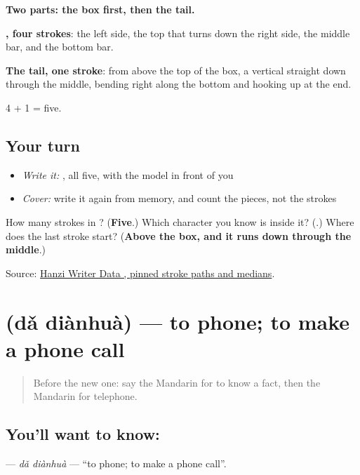 \begin{quote}
\end{quote}

\textbf{Two parts: the box first, then the tail.}

\textbf{, four strokes}: the left side, the top that turns down the right side, the middle bar, and the bottom bar.

\textbf{The tail, one stroke}: from above the top of the box, a vertical straight down through the middle, bending right along the bottom and hooking up at the end.

4 + 1 = five.

\subsection*{Your turn}
\begin{itemize}
\raggedright
  \item \emph{Write it:} , all five, with the model in front of you
  \item \emph{Cover:} write it again from memory, and count the pieces, not the strokes
\end{itemize}

\begin{tcolorbox}[breakable,colback=teal!4,colframe=teal!35!black,title={Before you move on}]
How many strokes in ? (\textbf{Five}.) Which character you know is inside it? (\textbf{}.) Where does the last stroke start? (\textbf{Above the box, and it runs down through the middle}.)

Source: \href{https://raw.githubusercontent.com/chanind/hanzi-writer-data/68d10a4b21150cae5e1ebbd223eed289cf32d90c/data/\%E7\%94\%B5.json}{Hanzi Writer Data , pinned stroke paths and medians}.
\end{tcolorbox}
\section[\texorpdfstring{\zh{打电话} (dǎ diànhuà)}{打电话 (dǎ diànhuà)}]{ (dǎ diànhuà) — to phone; to make a phone call}

\label{lesson:ZH-C63-dadianhua}



\begin{quote}
Before the new one: say the Mandarin for to know a fact, then the Mandarin for telephone.
\end{quote}

\subsection*{You'll want to know: }
\textbf{} — \emph{dǎ diànhuà} — \textquotedblleft{}to phone; to make a phone call\textquotedblright{}.

